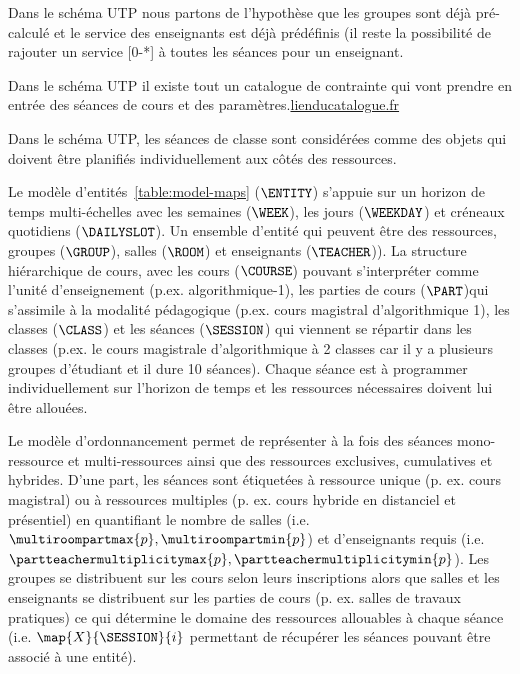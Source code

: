 Dans le schéma UTP nous partons de l'hypothèse que les groupes sont déjà pré-calculé et le service des enseignants est déjà prédéfinis (il reste la possibilité de rajouter un service [0-*] à toutes les séances pour un enseignant.

Dans le schéma UTP il existe tout un catalogue de contrainte qui vont prendre en entrée des séances de cours et des paramètres.\url{lienducatalogue.fr}




Dans le schéma UTP, les séances de classe sont considérées comme des objets qui doivent être planifiés individuellement aux côtés des ressources.

Le modèle d'entités~\ref{table:model-maps} ($\ENTITY$) s'appuie sur un horizon de temps multi-échelles avec les semaines ($\WEEK$), les jours ($\WEEKDAY$) et créneaux quotidiens ($\DAILYSLOT$). Un ensemble d'entité qui peuvent être des ressources, groupes ($\GROUP$), salles ($\ROOM$) et enseignants ($\TEACHER$)). La structure hiérarchique de cours, avec les cours ($\COURSE$) pouvant s'interpréter comme l'unité d'enseignement (p.ex. algorithmique-1), les parties de cours ($\PART$)qui s'assimile à la modalité pédagogique (p.ex. cours magistral d'algorithmique 1), les classes ($\CLASS$) et les séances ($\SESSION$) qui viennent se répartir dans les classes (p.ex. le cours magistrale d'algorithmique à 2 classes car il y a plusieurs groupes d'étudiant et il dure 10 séances). Chaque séance est à programmer individuellement sur l'horizon de temps et les ressources nécessaires doivent lui être allouées.

Le modèle d'ordonnancement permet de représenter à la fois des séances mono-ressource et multi-ressources ainsi que des ressources exclusives, cumulatives et hybrides. D'une part, les séances sont étiquetées à ressource unique (p. ex. cours magistral) ou à ressources multiples (p. ex. cours hybride en distanciel et présentiel) en quantifiant le nombre de salles (i.e. $\multiroompartmax{p}, \multiroompartmin{p}$) et d'enseignants requis (i.e. $\partteachermultiplicitymax{p}, \partteachermultiplicitymin{p}$).
Les groupes se distribuent sur les cours selon leurs inscriptions alors que salles et les enseignants se distribuent sur les parties de cours (p. ex. salles de travaux pratiques) ce qui détermine %
le domaine des ressources allouables à chaque séance (i.e. $\map{X}{\SESSION}{i}$ permettant de récupérer les séances pouvant être associé à une entité).


